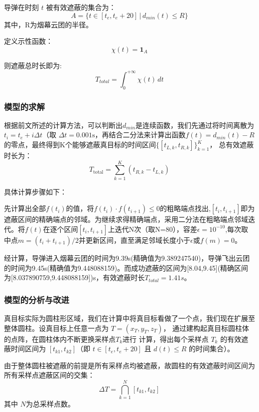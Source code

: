 \documentclass[withoutpreface]{cumcmthesis}
\begin{document}
导弹在时刻 $t$ 被有效遮蔽的集合为：
\begin{equation}   
A=\{t \in [t_e, t_e + 20]\,\vert \, d_{min}(t) \leq R\}
\end{equation}
其中，R为烟幕云团的半径。

定义示性函数：
\begin{equation}
    \chi (t)=\mathbf{1}_A
\end{equation}

则遮蔽总时长即为:
\begin{equation}
    T_{total}=\int_{0}^{+\infty} \chi (t)  \,dt 
\end{equation}


\subsubsection{模型的求解}
根据前文所述的计算方法，可以判断出$d_{min}$是连续函数，我们先通过将时间离散为
$t_{i} = t_{e} + i\Delta t$（取 $\Delta t = 0.001\text{s}$，再结合二分法来计算出函数$f(t)=d_{min}(t)-R$的零点，最终得到K个能够遮蔽真目标的时间区间$\{[t_{L,k}, t_{R,k}]\}_{k=1}^{K}$，
总有效遮蔽时长为：
\begin{equation}
T_{\text{total}} = \sum_{k=1}^{K} (t_{R,k} - t_{L,k})
\end{equation}

具体计算步骤如下：

先计算出全部$f(t_i)$的值，将$f(t_i)\cdot f(t_{i+1})\leq 0$的粗略端点找出,$[t_i,t_{i+1}]$即为遮蔽区间的精确端点的邻域。为继续求得精确端点，采用二分法在粗略端点邻域迭代。将$f(t)$在逐个区间$[t_i,t_{i+1}]$上迭代N次（取N=80），容差$\epsilon =10^{-10}$,每次取中点$m=(t_i+t_{i+1})/2$并更新区间，直至满足邻域长度小于$\epsilon $或$f(m)=0$。

经计算，导弹进入烟幕云团的时间为9.39s(精确值为9.389247540)，导弹飞出云团的时间为9.45s(精确值为9.448088159)。而成功遮蔽的区间为[8.04,9.45](精确区间为[8.037890759,9.448088159])s，有效遮蔽时长$T_{total}=1.41s$。
\subsubsection{模型的分析与改进}
真目标实际为圆柱形区域，我们在计算中将真目标看做了一个点，我们现在扩展至整体圆柱。设真目标上任意一点为 $T = (x_T, y_T, z_T)$，
通过建构起真目标圆柱体的点阵，在圆柱体内不断更换采样点$T_k$进行 计算，得出每个采样点 $T_k$ 的有效遮蔽时间区间为 $[t_{k1}, t_{k2}]$（即 $t \in [t_e, t_e + 20]$ 且 $d(t) \leq R$ 的时间集合）。

由于整体圆柱被遮蔽的前提是所有采样点均被遮蔽，故圆柱的有效遮蔽时间区间为所有采样点遮蔽区间的交集：
\begin{equation}
    \Delta T = \bigcap_{k=1}^{N} [t_{k1}, t_{k2}]
\end{equation}
其中 $N$为总采样点数。
\end{document}

